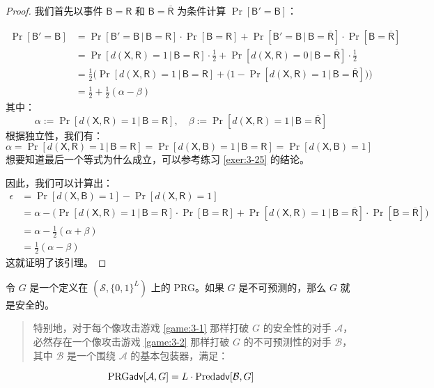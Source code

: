 \begin{proof}
我们首先以事件 $\mathsf{B}=\mathsf{R}$ 和 $\mathsf{B}=\mathsf{\overline R}$ 为条件计算 $\Pr[\mathsf{B}'=\mathsf{B}]$：

\[
\begin{aligned}
\Pr[\mathsf{B}'=\mathsf{B}]
&=\Pr[\mathsf{B}'=\mathsf{B}\,|\,\mathsf{B}=\mathsf{R}]\cdot\Pr[\mathsf{B}=\mathsf{R}]+\Pr[\mathsf{B}'=\mathsf{B}\,|\,\mathsf{B}=\mathsf{\overline R}]\cdot\Pr[\mathsf{B}=\mathsf{\overline R}]\\
&=\Pr[d(\mathsf{X},\mathsf{R})=1\,|\,\mathsf{B}=\mathsf{R}]\cdot\frac{1}{2}+\Pr[d(\mathsf{X},\mathsf{R})=0\,|\,\mathsf{B}=\mathsf{\overline R}]\cdot\frac{1}{2}\\
&=\frac{1}{2}
\Big(\Pr[d(\mathsf{X},\mathsf{R})=1\,|\,\mathsf{B}=\mathsf{R}]+
\big(
1-\Pr[d(\mathsf{X},\mathsf{R})=1\,|\,\mathsf{B}=\mathsf{\overline R}]
\big)
\Big)\\
&=\frac{1}{2}+\frac{1}{2}(\alpha-\beta)
\end{aligned}
\]
其中：
\[
\alpha:=\Pr[d(\mathsf{X},\mathsf{R})=1\,|\,\mathsf{B}=\mathsf{R}],\quad
\beta:=\Pr[d(\mathsf{X},\mathsf{R})=1\,|\,\mathsf{B}=\mathsf{\overline R}]
\]
根据独立性，我们有：
\[
\alpha=\Pr[d(\mathsf{X},\mathsf{R})=1\,|\,\mathsf{B}=\mathsf{R}]=\Pr[d(\mathsf{X},\mathsf{B})=1\,|\,\mathsf{B}=\mathsf{R}]=\Pr[d(\mathsf{X},\mathsf{B})=1]
\]
想要知道最后一个等式为什么成立，可以参考练习 \ref{exer:3-25} 的结论。

因此，我们可以计算出：
\[
\begin{aligned}
\epsilon
&=\Pr[d(\mathsf{X},\mathsf{B})=1]-\Pr[d(\mathsf{X},\mathsf{R})=1]\\
&=\alpha-
\Big(\Pr[d(\mathsf{X},\mathsf{R})=1\,|\,\mathsf{B}=\mathsf{R}]\cdot\Pr[\mathsf{B}=\mathsf{R}]+\Pr[d(\mathsf{X},\mathsf{R})=1\,|\,\mathsf{B}=\mathsf{\overline R}]\cdot\Pr[\mathsf{B}=\mathsf{\overline R}]
\Big)\\
&=\alpha-\frac{1}{2}(\alpha+\beta)\\
&=\frac{1}{2}(\alpha-\beta)
\end{aligned}
\]
这就证明了该引理。
\end{proof}

\begin{theorem}
令 $G$ 是一个定义在 $(\mathcal{S},\{0,1\}^L)$ 上的 PRG。如果 $G$ 是不可预测的，那么 $G$ 就是安全的。
\begin{quote}
特别地，对于每个像攻击游戏 \ref{game:3-1} 那样打破 $G$ 的安全性的对手 $\mathcal{A}$，必然存在一个像攻击游戏 \ref{game:3-2} 那样打破 $G$ 的不可预测性的对手 $\mathcal{B}$，其中 $\mathcal{B}$ 是一个围绕 $\mathcal{A}$ 的基本包装器，满足：
\end{quote}
\[
{\rm PRG\mathsf{adv}}[\mathcal{A},G]=L\cdot{\rm Pred\mathsf{adv}}[\mathcal{B},G]
\]
\end{theorem}

